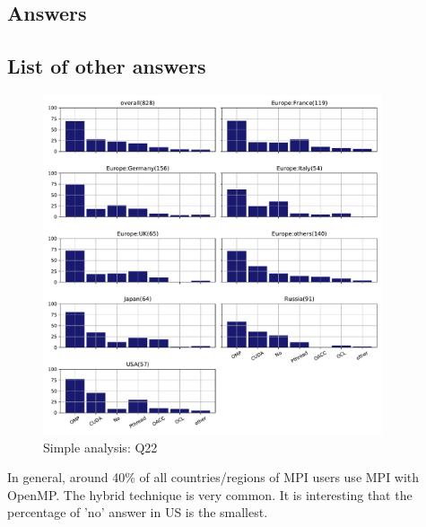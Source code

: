 
\subsection{Answers}



\subsection{List of other answers}
\begin{itemize}

\end{itemize}

\begin{figure}[htb]
\begin{center}
\includegraphics[width=10cm]{../pdfs/Q22.pdf}
\caption{Simple analysis: Q22}
\label{fig:Q22}
\end{center}
\end{figure}

In general, around 40\% of all countries/regions of MPI users
use MPI with OpenMP. The hybrid technique is very common.
It is interesting that the percentage of 'no' answer in US is the
smallest. 
